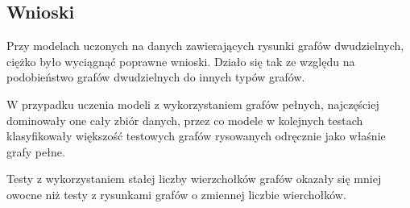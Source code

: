 \subsection{Wnioski}
Przy modelach uczonych na danych zawierających rysunki grafów dwudzielnych, ciężko było wyciągnąć poprawne wnioski.
Działo się tak ze względu na podobieństwo grafów dwudzielnych do innych typów grafów. 

W przypadku uczenia modeli z wykorzystaniem grafów pełnych, najczęściej dominowały one cały zbiór danych,
przez co modele w kolejnych testach klasyfikowały większość testowych grafów rysowanych odręcznie jako właśnie grafy pełne.

Testy z wykorzystaniem stałej liczby wierzchołków grafów okazały się mniej owocne niż testy z rysunkami grafów
o zmiennej liczbie wierchołków.